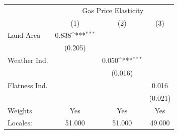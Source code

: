 {
\def\sym#1{\ifmmode^{#1}\else\(^{#1}\)\fi}
\begin{tabular}{l*{3}{c}}
\hline\hline
            &\multicolumn{3}{c}{Gas Price Elasticity}                         \\
            &\multicolumn{1}{c}{(1)}         &\multicolumn{1}{c}{(2)}         &\multicolumn{1}{c}{(3)}         \\
\hline
Land Area   &       0.838\sym{***}&                     &                     \\
            &     (0.205)         &                     &                     \\
[1em]
Weather Ind.&                     &       0.050\sym{***}&                     \\
            &                     &     (0.016)         &                     \\
[1em]
Flatness Ind.&                     &                     &       0.016         \\
            &                     &                     &     (0.021)         \\
\hline
Weights     &         Yes         &         Yes         &         Yes         \\
Locales:    &      51.000         &      51.000         &      49.000         \\
\hline\hline
\end{tabular}
}
